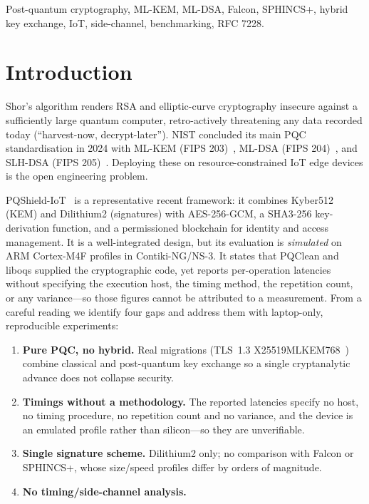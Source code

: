 \documentclass[conference]{IEEEtran}
\begin{document}
\begin{IEEEkeywords}
Post-quantum cryptography, ML-KEM, ML-DSA, Falcon, SPHINCS+, hybrid key
exchange, IoT, side-channel, benchmarking, RFC 7228.
\end{IEEEkeywords}

\section{Introduction}
Shor's algorithm renders RSA and elliptic-curve cryptography insecure against
a sufficiently large quantum computer, retro-actively threatening any data
recorded today (``harvest-now, decrypt-later''). NIST concluded its main PQC
standardisation in 2024 with ML-KEM (FIPS 203)~\cite{fips203}, ML-DSA (FIPS
204)~\cite{fips204}, and SLH-DSA (FIPS 205)~\cite{fips205}. Deploying these on
resource-constrained IoT edge devices is the open engineering problem.

PQShield-IoT~\cite{narayanan2026pqshield} is a representative recent framework:
it combines Kyber512 (KEM) and Dilithium2 (signatures) with AES-256-GCM, a
SHA3-256 key-derivation function, and a permissioned blockchain for identity
and access management. It is a well-integrated design, but its evaluation is
\emph{simulated} on ARM Cortex-M4F profiles in Contiki-NG/NS-3. It states that
PQClean and liboqs supplied the cryptographic code, yet reports per-operation
latencies without specifying the execution host, the timing method, the
repetition count, or any variance---so those figures cannot be attributed to a
measurement. From a careful reading we identify four gaps and address them with
laptop-only, reproducible experiments:

\begin{enumerate}
\item \textbf{Pure PQC, no hybrid.} Real migrations (TLS~1.3
  X25519MLKEM768~\cite{x25519mlkem768}) combine classical and post-quantum
  key exchange so a single cryptanalytic advance does not collapse security.
\item \textbf{Timings without a methodology.} The reported latencies specify no
  host, no timing procedure, no repetition count and no variance, and the device
  is an emulated profile rather than silicon---so they are unverifiable.
\item \textbf{Single signature scheme.} Dilithium2 only; no comparison with
  Falcon or SPHINCS+, whose size/speed profiles differ by orders of magnitude.
\item \textbf{No timing/side-channel analysis.}
\end{enumerate}
\end{document}

